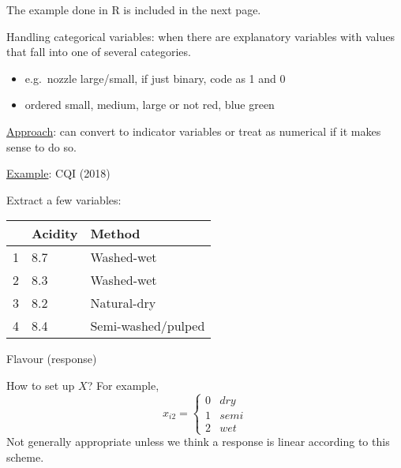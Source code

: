 The example done in R is included in the next page.


Handling categorical variables: when there are explanatory
variables with values that fall into one of
several categories.
\begin{itemize}
    \item e.g.\ nozzle large/small, if just binary,
          code as 1 and 0
    \item ordered small, medium, large or not
          red, blue green
\end{itemize}
\underline{Approach}: can convert to indicator variables
or treat as numerical if it makes sense to do so.

\underline{Example}: CQI (2018)

Extract a few variables:
\begin{table}[H]
    \centering
    \begin{tabularx}{0.7\linewidth}{@{}YYY@{}}
          & Acidity & Method             \\
         & 8.7     & Washed-wet         \\
        2 & 8.3     & Washed-wet         \\
        3 & 8.2     & Natural-dry        \\
        4 & 8.4     & Semi-washed/pulped
    \end{tabularx}
\end{table}
Flavour (response)

How to set up $ X $? For example,
\[ x_{i2}=\begin{cases*}
        0 & dry\\
        1 & semi\\
        2 & wet
    \end{cases*} \]
Not generally appropriate unless we think
a response is linear according to this scheme.

